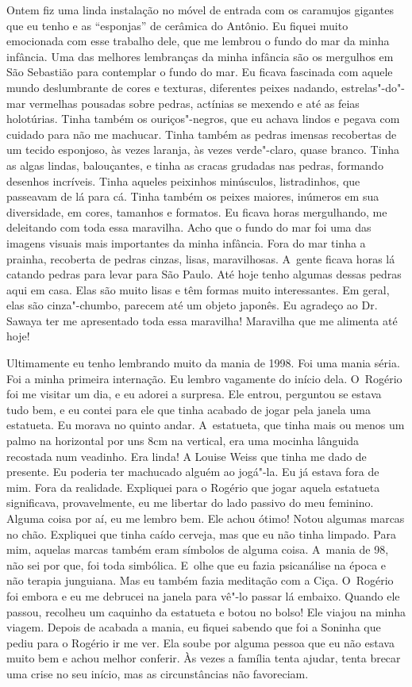Ontem fiz uma linda instalação no móvel de entrada com os caramujos
gigantes que eu tenho e as ``esponjas'' de cerâmica do Antônio. Eu
fiquei muito emocionada com esse trabalho dele, que me lembrou o fundo
do mar da minha infância. Uma das melhores lembranças da minha infância
são os mergulhos em São Sebastião para contemplar o fundo do mar. Eu
ficava fascinada com aquele mundo deslumbrante de cores e texturas,
diferentes peixes nadando, estrelas"-do"-mar vermelhas pousadas sobre
pedras, actínias se mexendo e até as feias holotúrias. Tinha também os
ouriços"-negros, que eu achava lindos e pegava com cuidado para não me
machucar. Tinha também as pedras imensas recobertas de um tecido
esponjoso, às vezes laranja, às vezes verde"-claro, quase branco. Tinha
as algas lindas, balouçantes, e tinha as cracas grudadas nas pedras,
formando desenhos incríveis. Tinha aqueles peixinhos minúsculos,
listradinhos, que passeavam de lá para cá. Tinha também os peixes
maiores, inúmeros em sua diversidade, em cores, tamanhos e formatos. Eu
ficava horas mergulhando, me deleitando com toda essa maravilha. Acho
que o fundo do mar foi uma das imagens visuais mais importantes da minha
infância. Fora do mar tinha a prainha, recoberta de pedras cinzas,
lisas, maravilhosas. A~gente ficava horas lá catando pedras para levar
para São Paulo. Até hoje tenho algumas dessas pedras aqui em casa. Elas
são muito lisas e têm formas muito interessantes. Em geral, elas são
cinza"-chumbo, parecem até um objeto japonês. Eu agradeço ao Dr. Sawaya
ter me apresentado toda essa maravilha! Maravilha que me alimenta até
hoje!

Ultimamente eu tenho lembrando muito da mania de 1998. Foi uma mania
séria. Foi a minha primeira internação. Eu lembro vagamente do início
dela. O~Rogério foi me visitar um dia, e eu adorei a surpresa. Ele
entrou, perguntou se estava tudo bem, e eu contei para ele que tinha
acabado de jogar pela janela uma estatueta. Eu morava no quinto andar. A~estatueta, que tinha mais ou menos um palmo na horizontal por uns 8cm na
vertical, era uma mocinha lânguida recostada num veadinho. Era linda! A
Louise Weiss que tinha me dado de presente. Eu poderia ter machucado
alguém ao jogá"-la. Eu já estava fora de mim. Fora da realidade.
Expliquei para o Rogério que jogar aquela estatueta significava,
provavelmente, eu me libertar do lado passivo do meu feminino. Alguma
coisa por aí, eu me lembro bem. Ele achou ótimo! Notou algumas marcas no
chão. Expliquei que tinha caído cerveja, mas que eu não tinha limpado.
Para mim, aquelas marcas também eram símbolos de alguma coisa. A~mania
de 98, não sei por que, foi toda simbólica. E~olhe que eu fazia
psicanálise na época e não terapia junguiana. Mas eu também fazia
meditação com a Ciça. O~Rogério foi embora e eu me debrucei na janela
para vê"-lo passar lá embaixo. Quando ele passou, recolheu um caquinho da
estatueta e botou no bolso! Ele viajou na minha viagem. Depois de
acabada a mania, eu fiquei sabendo que foi a Soninha que pediu para o
Rogério ir me ver. Ela soube por alguma pessoa que eu não estava muito
bem e achou melhor conferir. Às vezes a família tenta ajudar, tenta
brecar uma crise no seu início, mas as circunstâncias não favoreciam.

